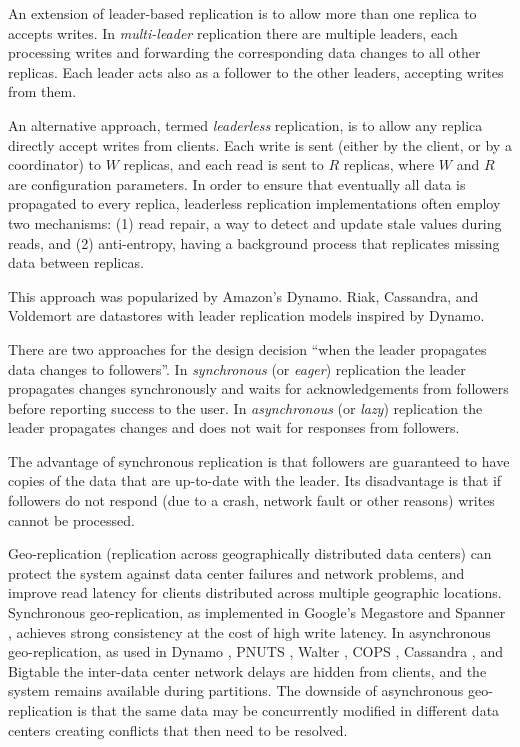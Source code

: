 An extension of leader-based replication is to allow more than one replica to accepts writes.
In \textit{multi-leader} replication there are multiple leaders,
each processing writes and forwarding the corresponding data changes to all other replicas.
Each leader acts also as a follower to the other leaders, accepting writes from them.

An alternative approach, termed \textit{leaderless} replication,
is to allow any replica directly accept writes from clients.
Each write is sent (either by the client, or by a coordinator) to $W$ replicas, and each read is sent to $R$ replicas,
where $W$ and $R$ are configuration parameters.
In order to ensure that eventually all data is propagated to every replica,
leaderless replication implementations often employ two mechanisms:
(1) read repair, a way to detect and update stale values during reads,
and (2) anti-entropy, having a background process that replicates missing data between replicas.

This approach was popularized by Amazon's Dynamo.
Riak, Cassandra, and Voldemort are datastores with leader replication models inspired by Dynamo.

\bigskip
\noindent
There are two approaches for the design decision ``when the leader propagates data changes to followers''.
In \textit{synchronous} (or \textit{eager}) replication the leader propagates changes synchronously
and waits for acknowledgements from followers before reporting success to the user.
In \textit{asynchronous} (or \textit{lazy}) replication the leader propagates changes
and does not wait for responses from followers.

The advantage of synchronous replication is that followers are guaranteed to have copies of the data that are
up-to-date with the leader.
Its disadvantage is that if followers do not respond (due to a crash, network fault or other reasons)
writes cannot be processed.

\bigskip
\noindent
Geo-replication (replication across geographically distributed data centers) can protect the system against data center
failures and network problems,
and improve read latency for clients distributed across multiple geographic locations.
Synchronous geo-replication, as implemented in Google's Megastore \cite{baker:megastore}
and Spanner \cite{corbett:spanner, bacon:spanner},
achieves strong consistency at the cost of high write latency.
In asynchronous geo-replication, as used in Dynamo \cite{deCandia:dynamo}, PNUTS \cite{cooper:pnuts08, cooper:pnuts19},
Walter \cite{sovran:walter}, COPS \cite{lloyd:cops}, Cassandra \cite{lakshman:cassandra}, and Bigtable \cite{chang:bigtable}
the inter-data center network delays are hidden from clients,
and the system remains available during partitions.
The downside of asynchronous geo-replication is that the same data may be concurrently modified in different data centers
creating conflicts that then need to be resolved.

